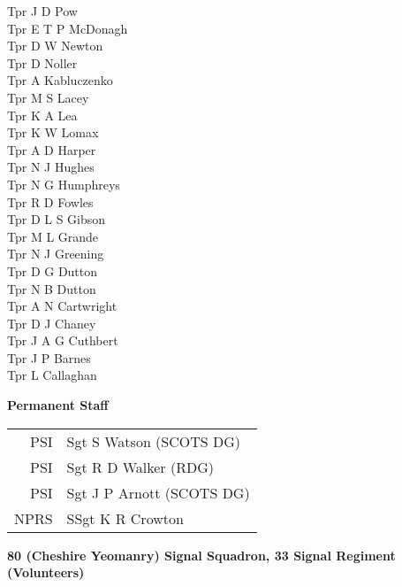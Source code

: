 \begin{multicols}{3}
  Tpr J D Pow \\
  Tpr E T P McDonagh \\
  Tpr D W Newton \\
  Tpr D Noller \\
  Tpr A Kabluczenko \\
  Tpr M S Lacey \\
  Tpr K A Lea \\
  Tpr K W Lomax \\
  Tpr A D Harper \\
  Tpr N J Hughes \\
  Tpr N G Humphreys \\
  Tpr R D Fowles \\
  Tpr D L S Gibson \\
  Tpr M L Grande \\
  Tpr N J Greening \\
  Tpr D G Dutton \\
  Tpr N B Dutton \\
  Tpr A N Cartwright \\
  Tpr D J Chaney \\
  Tpr J A G Cuthbert \\
  Tpr J P Barnes \\
  Tpr L Callaghan \\
\end{multicols}

\pagebreak

\vspace*{10mm}

\begin{center}
  \Large
  \textbf{Permanent Staff}
\end{center}

\begin{center}
  \begin{tabular}{rl}
    PSI & Sgt S Watson (SCOTS DG) \\
    PSI & Sgt R D Walker (RDG) \\
    PSI & Sgt J P Arnott (SCOTS DG) \\
    NPRS & SSgt K R Crowton \\
  \end{tabular}
\end{center}

\vspace{10mm}

\begin{center}
  \Large
  \textbf{80 (Cheshire Yeomanry) Signal Squadron, 33 Signal Regiment (Volunteers)}
\end{center}

